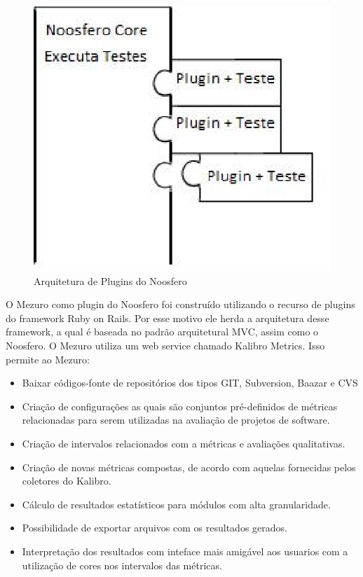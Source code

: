 \graphicspath{{figuras/}}
\begin{figure}[!htb]
\centering
\includegraphics{plugins}
\caption{Arquitetura de Plugins do Noosfero}
\label{Rotulo}
\end{figure}

O Mezuro como plugin do Noosfero foi construído utilizando o recurso de plugins do framework Ruby on Rails. Por esse motivo ele herda a arquitetura desse framework, a qual é baseada no padrão arquitetural MVC, assim como o Noosfero.
O Mezuro utiliza um web service chamado Kalibro Metrics. Isso permite ao Mezuro: 

\begin{itemize}
\item Baixar códigos-fonte de repositórios dos tipos GIT, Subversion, Baazar e CVS
\item Criação de configurações as quais são conjuntos pré-definidos de métricas relacionadas para serem utilizadas na avaliação de projetos de software.
\item Criação de intervalos relacionados com a métricas e avaliações qualitativas.
\item Criação de novas métricas compostas, de acordo com aquelas fornecidas pelos coletores do Kalibro.
\item Cálculo de resultados estatísticos para módulos com alta granularidade.
\item Possibilidade de exportar arquivos com os resultados gerados.
\item Interpretação dos resultados com inteface mais amigável aos usuarios com a utilização de cores nos intervalos das métricas.
\end{itemize}

